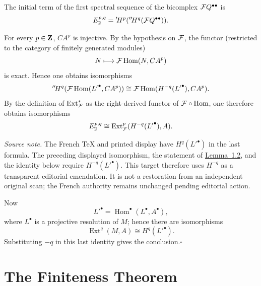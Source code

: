 
The initial term of the first spectral sequence of the bicomplex
$\cF Q^{\bullet\bullet}$ is
\[
  E_2^{p,q}
  ={}'\!H^p({}''\!H^q(\cF Q^{\bullet\bullet})).
\]

For every $p\in\mathbf Z$, $CA^p$ is injective. By the hypothesis on $\cF$, the
functor (restricted to the category of finitely generated modules)
\[
  N\longmapsto \cF\operatorname{Hom}(N,CA^p)
\]
is exact. Hence one obtains isomorphisms
\[
  {}''\!H^q(\cF\operatorname{Hom}({L'}^\bullet,CA^p))
  \cong
  \cF\operatorname{Hom}(H^{-q}({L'}^\bullet),CA^p).
\]
By the definition of $\operatorname{Ext}^{\ast}_{\cF}$ as the right-derived functor
of $\cF\circ\operatorname{Hom}$, one therefore obtains isomorphisms
\[
  E_2^{p,q}
  \cong
  \operatorname{Ext}^{p}_{\cF}(H^{-q}({L'}^\bullet),A).
\]

\noindent\emph{Source note.} The French TeX and printed display have
$H^q({L'}^\bullet)$ in the last formula. The preceding displayed
isomorphism, the statement of \hyperref[VIII.1.2]{Lemma~1.2}, and the identity below require
$H^{-q}({L'}^\bullet)$. This target therefore uses $H^{-q}$ as a transparent
editorial emendation. It is not a restoration from an independent original
scan; the French authority remains unchanged pending editorial action.

Now
\[
  {L'}^\bullet=\operatorname{Hom}^\bullet(L^\bullet,A^\bullet),
\]
where $L^\bullet$ is a projective resolution of $M$; hence there are
isomorphisms
\[
  \operatorname{Ext}^{q}(M,A)\cong H^q({L'}^\bullet).
\]
Substituting $-q$ in this last identity gives the conclusion.\hfill$\square$


\let\cF\calF\renewcommand{\theequation}{\thesection.\arabic{equation}}

\setcounter{section}{1}
\section{The Finiteness Theorem}\label{VIII.2}

